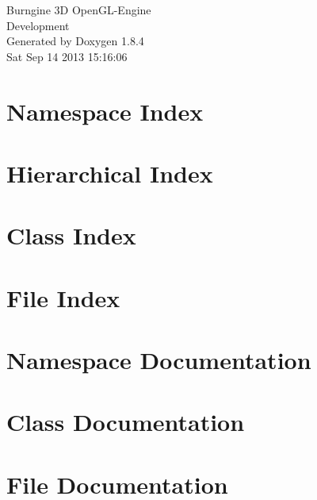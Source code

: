 \documentclass[twoside]{book}
\newcommand{\clearemptydoublepage}{%
  \newpage{\pagestyle{empty}\cleardoublepage}%
}
\begin{document}
\hypersetup{pageanchor=false}
\begin{titlepage}
\vspace*{7cm}
\begin{center}%
{\Large Burngine 3\-D Open\-G\-L-\/\-Engine \\[1ex]\large Development }\\
\vspace*{1cm}
{\large Generated by Doxygen 1.8.4}\\
\vspace*{0.5cm}
{\small Sat Sep 14 2013 15:16:06}\\
\end{center}
\end{titlepage}
\clearemptydoublepage
\tableofcontents
\clearemptydoublepage
{}
\hypersetup{pageanchor=true}

\chapter{Namespace Index}

\chapter{Hierarchical Index}

\chapter{Class Index}

\chapter{File Index}

\chapter{Namespace Documentation}

\chapter{Class Documentation}












\chapter{File Documentation}



























\newpage
{}
{}
\printindex
\end{document}
